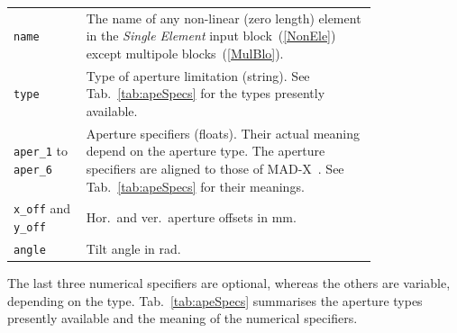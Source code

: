 \begin{longtabu}{@{}lp{0.8\linewidth}}
    \texttt{name}   & The name of any non-linear (zero length) element in the \textit{Single Element} input block~(\ref{NonEle}) except multipole blocks~(\ref{MulBlo}). \\
    \texttt{type}   & Type of aperture limitation (string). See Tab.~\ref{tab:apeSpecs} for the types
                      presently available. \\
    \texttt{aper\_1} to \texttt{aper\_6}  & Aperture specifiers (floats).
                      Their actual meaning depend on the aperture type. The aperture specifiers are
                      aligned to those of MAD-X~\cite{MAD}. See Tab.~\ref{tab:apeSpecs} for their
                      meanings.\\
    \texttt{x\_off} and \texttt{y\_off}  & Hor.~and ver.~aperture offsets in mm. \\
    \texttt{angle}  & Tilt angle in rad. \\
\end{longtabu}

The last three numerical specifiers are optional, whereas the others are variable, depending
on the type. Tab.~\ref{tab:apeSpecs} summarises the aperture types presently available
and the meaning of the numerical specifiers.

